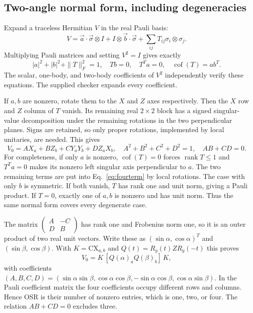 \documentclass[a4paper,onecolumn,11pt,unpublished]{quantumarticle}
\newcommand{\CNOT}{\mathrm{CX}}
\begin{document}
\subsection{Two-angle normal form, including degeneracies}
Expand a traceless Hermitian $V$ in the real Pauli basis:
\begin{equation}
 V=\vec a\cdot\vec\sigma\otimes I+I\otimes\vec b\cdot\vec\sigma
       +\sum_{ij}T_{ij}\sigma_i\otimes\sigma_j.
\end{equation}
Multiplying Pauli matrices and setting $V^2=I$ gives exactly
\begin{equation}\label{eq:involution}
 |a|^2+|b|^2+\|T\|_F^2=1,\quad Tb=0,\quad T^Ta=0,
 \quad\operatorname{cof}(T)=ab^T.
\end{equation}
The scalar, one-body, and two-body coefficients of $V^2$ independently
verify these equations. The supplied checker expands every coefficient.

If $a,b$ are nonzero, rotate them to the $X$ and $Z$ axes respectively.
Then the $X$ row and $Z$ column of $T$ vanish. Its remaining real $2\times2$
block has a signed singular-value decomposition under the remaining rotations
in the two perpendicular planes. Signs are retained, so only proper rotations,
implemented by local unitaries, are needed. This gives
\begin{equation}\label{eq:fourterm}
 V_0=A X_a+B Z_b+C Y_aY_b+D Z_aX_b,\quad
 A^2+B^2+C^2+D^2=1,\quad AB+CD=0.
\end{equation}
For completeness, if only $a$ is nonzero, $\operatorname{cof}(T)=0$ forces
$\operatorname{rank}T\le1$ and $T^Ta=0$ makes its nonzero left singular
axis perpendicular to $a$. The two remaining terms are put into
Eq.~\eqref{eq:fourterm} by local rotations. The case with only $b$ is
symmetric. If both vanish, $T$ has rank one and unit norm, giving a Pauli
product. If $T=0$, exactly one of $a,b$ is nonzero and has unit norm.
Thus the same normal form covers every degenerate case.

The matrix $\left(\begin{smallmatrix}A&-C\\D&B\end{smallmatrix}\right)$
has rank one and Frobenius norm one, so it is an outer product of two real
unit vectors. Write these as $(\sin\alpha,\cos\alpha)^T$ and
$(\sin\beta,\cos\beta)$. With $K=\CNOT_{a,b}$ and
$Q(t)=R_y(t)ZR_y(-t)$ this proves
\begin{equation}\label{eq:normalform}
 V_0=K\,[Q(\alpha)_aQ(\beta)_b]\,K,
\end{equation}
with coefficients
$(A,B,C,D)=(\sin\alpha\sin\beta,\cos\alpha\cos\beta,
-\sin\alpha\cos\beta,\cos\alpha\sin\beta)$.
In the Pauli coefficient matrix the four coefficients occupy different rows
and columns. Hence OSR is their number of nonzero entries, which is one,
two, or four. The relation $AB+CD=0$ excludes three.
\end{document}
